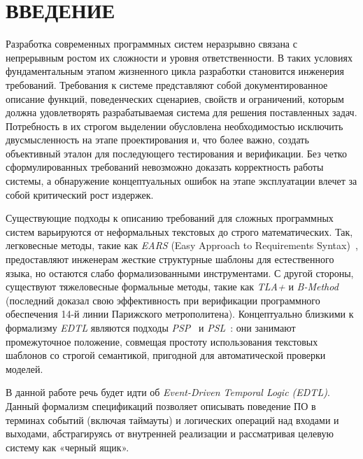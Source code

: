 





\renewcommand*\contentsname{СОДЕРЖАНИЕ}
{
\setcounter{tocdepth}{3}
\tableofcontents
}
\pagebreak

\section*{ВВЕДЕНИЕ}\label{sec:introduction}

Разработка современных программных систем неразрывно связана с непрерывным ростом их сложности и уровня ответственности. В таких условиях фундаментальным этапом жизненного цикла разработки становится инженерия требований. Требования к системе представляют собой документированное описание функций, поведенческих сценариев, свойств и ограничений, которым должна удовлетворять разрабатываемая система для решения поставленных задач. Потребность в их строгом выделении обусловлена необходимостью исключить двусмысленность на этапе проектирования и, что более важно, создать объективный эталон для последующего тестирования и верификации. Без четко сформулированных требований невозможно доказать корректность работы системы, а обнаружение концептуальных ошибок на этапе эксплуатации влечет за собой критический рост издержек.

Существующие подходы к описанию требований для сложных программных систем варьируются от неформальных текстовых до строго математических. Так, легковесные методы, такие как \textit{EARS} (Easy Approach to Requirements Syntax)~\cite{ears}, предоставляют инженерам жесткие структурные шаблоны для естественного языка, но остаются слабо формализованными инструментами. С другой стороны, существуют тяжеловесные формальные методы, такие как \textit{TLA+} и \textit{B-Method}~\cite{meteor} (последний доказал свою эффективность при верификации программного обеспечения 14-й линии Парижского метрополитена). Концептуально близкими к формализму \textit{EDTL} являются подходы \textit{PSP}~\cite{psp} и \textit{PSL}~\cite{psl}: они занимают промежуточное положение, совмещая простоту использования текстовых шаблонов со строгой семантикой, пригодной для автоматической проверки моделей.

В данной работе речь будет идти об \textit{Event-Driven Temporal Logic (EDTL)}. Данный формализм спецификаций позволяет описывать поведение ПО в терминах событий (включая таймауты) и логических операций над входами и выходами, абстрагируясь от внутренней реализации и рассматривая целевую систему как «черный ящик».

